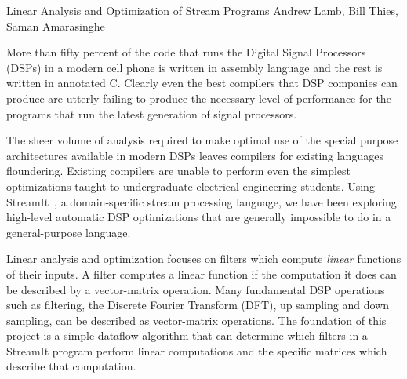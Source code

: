 

\formattitlecontents 
{Linear Analysis and Optimization of Stream Programs}
{Andrew Lamb, Bill Thies, Saman Amarasinghe}


%
More than fifty percent of the code that runs the Digital Signal Processors
(DSPs) in a modern cell phone is written in assembly language and the 
rest is written in annotated C\cite{gass-talk}. Clearly even the best 
compilers that DSP companies can produce are utterly failing to produce
the necessary level of performance for the programs that run the latest generation
of signal processors.

The sheer volume of analysis required to make optimal use of the special 
purpose architectures available in modern DSPs leaves compilers for existing languages 
floundering. Existing compilers are unable to perform even the simplest 
optimizations taught to undergraduate electrical engineering students. Using 
StreamIt~\cite{streamitcc}, 
a domain-specific stream processing language, we have been exploring
high-level automatic DSP optimizations that are generally impossible
to do in a general-purpose language.

Linear analysis and optimization\cite{pldi-03-linear}
focuses on filters which compute {\it linear} 
functions of their inputs. A filter computes a linear function if
the computation it does can be described by a vector-matrix operation. 
Many fundamental DSP operations such as filtering, the Discrete Fourier 
Transform (DFT), up sampling and down sampling, can be described 
as vector-matrix operations. The foundation of this project is
a simple dataflow algorithm that can determine which filters in a 
StreamIt program perform linear computations and the specific matrices
which describe that computation.

